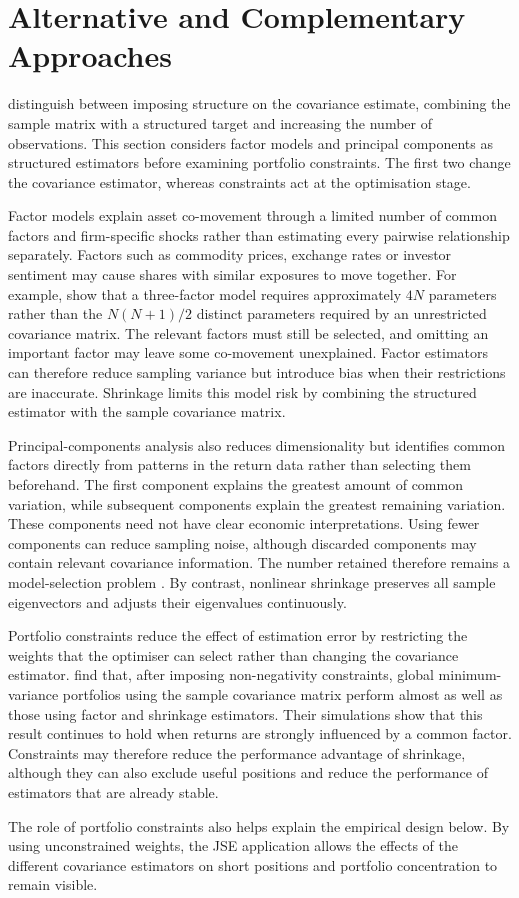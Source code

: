 \section{Alternative and Complementary Approaches}

\textcite[1652--1653]{jagannathan2003risk} distinguish between imposing structure on the covariance estimate, combining the sample matrix with a structured target and increasing the number of observations. This section considers factor models and principal components as structured estimators before examining portfolio constraints. The first two change the covariance estimator, whereas constraints act at the optimisation stage.

Factor models explain asset co-movement through a limited number of common factors and firm-specific shocks rather than estimating every pairwise relationship separately. Factors such as commodity prices, exchange rates or investor sentiment may cause shares with similar exposures to move together. For example, \textcite[186--187]{fan2007highdimensionalcovariancematrix} show that a three-factor model requires approximately \(4N\) parameters rather than the \(N(N+1)/2\) distinct parameters required by an unrestricted covariance matrix. The relevant factors must still be selected, and omitting an important factor may leave some co-movement unexplained. Factor estimators can therefore reduce sampling variance but introduce bias when their restrictions are inaccurate. Shrinkage limits this model risk by combining the structured estimator with the sample covariance matrix.

Principal-components analysis also reduces dimensionality but identifies common factors directly from patterns in the return data rather than selecting them beforehand. The first component explains the greatest amount of common variation, while subsequent components explain the greatest remaining variation. These components need not have clear economic interpretations. Using fewer components can reduce sampling noise, although discarded components may contain relevant covariance information. The number retained therefore remains a model-selection problem \parencite[191, 197--200]{bai2002determining}. By contrast, nonlinear shrinkage preserves all sample eigenvectors and adjusts their eigenvalues continuously.

Portfolio constraints reduce the effect of estimation error by restricting the weights that the optimiser can select rather than changing the covariance estimator. \textcite[1674--1677]{jagannathan2003risk} find that, after imposing non-negativity constraints, global minimum-variance portfolios using the sample covariance matrix perform almost as well as those using factor and shrinkage estimators. Their simulations show that this result continues to hold when returns are strongly influenced by a common factor. Constraints may therefore reduce the performance advantage of shrinkage, although they can also exclude useful positions and reduce the performance of estimators that are already stable.

The role of portfolio constraints also helps explain the empirical design below. By using unconstrained weights, the JSE application allows the effects of the different covariance estimators on short positions and portfolio concentration to remain visible.
